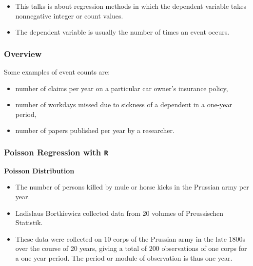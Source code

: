 \documentclass[MASTER.tex]{subfiles}
\begin{document}
\begin{frame}
	\Large
\begin{itemize}
\item This talks is about regression methods in which the dependent variable takes
nonnegative integer or count values. \item The dependent variable is usually the number of times an event occurs. 
\end{itemize}
\end{frame}
\begin{frame}
	\frametitle{Overview}
	\Large Some
examples of event counts are:
\begin{itemize}
\item number of claims per year on a particular car owner’s insurance policy,
\item number of workdays missed due to sickness of a dependent in a one-year period,
\item number of papers published per year by a researcher.
\end{itemize}
\end{frame}
\begin{frame}[fragile]
	
	\frametitle{Poisson Regression with \texttt{R} } 
	\Large	
	\textbf{Poisson Distribution} 
	
	\begin{itemize}
		\item The number of persons killed by mule or horse kicks in the Prussian army per year. 
		\item Ladislaus Bortkiewicz collected data from 20 volumes of Preussischen Statistik. 
		\item These data were collected on 10 corps of the Prussian army in the late 1800s over the course of 20 years, giving a total of 200 observations of one corps for a one year period. The period or module of observation is thus one year. 
		
	\end{itemize}
	
\end{frame}
\end{document}
